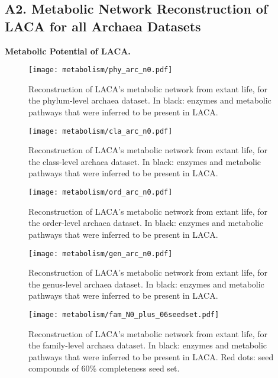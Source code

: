 \newpage
\subsection*{A2. Metabolic Network Reconstruction of LACA for all Archaea Datasets}
\textbf{Metabolic Potential of LACA.}

\begin{figure}[H]
    \centering
    \texttt{[image: metabolism/phy\_arc\_n0.pdf]}
    \caption{Reconstruction of LACA's metabolic network from extant life, for the phylum-level archaea dataset. In black: enzymes and metabolic pathways that were inferred to be present in LACA.}
    \label{phy4arc_metnet}
\end{figure}   

\begin{figure}[H]
    \centering
    \texttt{[image: metabolism/cla\_arc\_n0.pdf]}
    \caption{Reconstruction of LACA's metabolic network from extant life, for the class-level archaea dataset. In black: enzymes and metabolic pathways that were inferred to be present in LACA.}
    \label{cla4arc_metnet}
\end{figure}   

\begin{figure}[H]
    \centering
    \texttt{[image: metabolism/ord\_arc\_n0.pdf]}
    \caption{Reconstruction of LACA's metabolic network from extant life, for the order-level archaea dataset. In black: enzymes and metabolic pathways that were inferred to be present in LACA.}
    \label{ord4arc_metnet}
\end{figure}   

\begin{figure}[H]
    \centering
    \texttt{[image: metabolism/gen\_arc\_n0.pdf]}
    \caption{Reconstruction of LACA's metabolic network from extant life, for the genus-level archaea dataset. In black: enzymes and metabolic pathways that were inferred to be present in LACA.}
    \label{gen4arc_metnet}
\end{figure}   


\begin{figure}[H]
    \centering
    \texttt{[image: metabolism/fam\_N0\_plus\_06seedset.pdf]}
    \caption{Reconstruction of LACA's metabolic network from extant life, for the family-level archaea dataset. In black: enzymes and metabolic pathways that were inferred to be present in LACA. Red dots: seed compounds of 60\% completeness seed set.}
    \label{fam4arc_metnet_plus_seedset}
\end{figure}   

